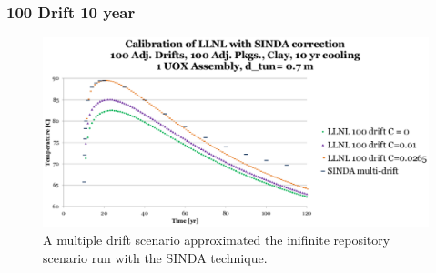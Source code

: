
\begin{frame}[ctb!]
  \frametitle{100 Drift 10 year}
  \begin{figure}[h]
    \begin{center}
      \includegraphics[width=.8\textwidth]{100drift10yr.eps}
      \caption{A multiple drift scenario approximated the inifinite repository 
      scenario run with the SINDA technique.}
    \end{center}
    \label{fig:100drift10yr}
  \end{figure}
\end{frame}

